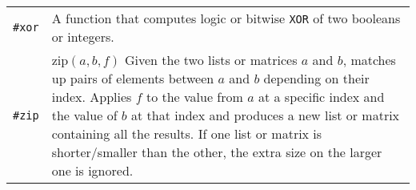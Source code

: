 \documentclass[10pt]{article}
\begin{document}
\begin{longtable}{p{}p{}}
        \verb|#xor|     & A function that computes logic or bitwise \verb|XOR| of two booleans or integers. \\
        \verb|#zip|     & $ \mathrm{zip}(a,b,f) $ Given the two lists or matrices $ a $ and $ b $, matches up pairs of elements between $ a $ and $ b $ depending on their index.
                          Applies $ f $ to the value from $ a $ at a specific index and the value of $ b $ at that index and produces a new list or matrix containing all the results.
                          If one list or matrix is shorter/smaller than the other, the extra size on the larger one is ignored. \\
    \end{longtable}
\end{document}
